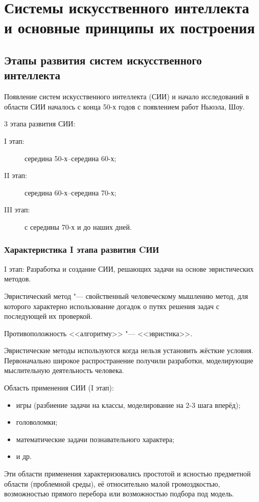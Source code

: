 \chapter{Системы искусственного интеллекта и основные принципы их построения}

\section{Этапы развития систем искусственного интеллекта}
Появление систем искусственного интеллекта (СИИ) и начало исследований
в области СИИ началось с конца 50-х годов с появлением работ Ньюэла,
Шоу.

3 этапа развития СИИ:
\begin{description}
\item[I этап:] середина 50-х--середина 60-х;
\item[II этап:] середина 60-х--середина 70-х;
\item[III этап:] с середины 70-х и до наших дней.
\end{description}

\subsection{Характеристика I этапа развития CИИ}
I этап: Разработка и создание СИИ, решающих задачи на основе
эвристических методов.

Эвристический метод "--- свойственный человеческому мышлению метод, для
которого характерно использование догадок о путях решения задач с
последующей их проверкой.

Противоположность <<алгоритму>> "--- <<эвристика>>.

Эвристические методы используются когда нельзя установить жёсткие
условия. Первоначально широкое распространение получили разработки,
моделирующие мыслительную деятельность человека.

Область применения СИИ (I этап):
\begin{itemize}
\item игры (разбиение задачи на классы, моделирование на 2-3 шага
  вперёд);
\item головоломки;
\item математические задачи познавательного характера;
\item и др.
\end{itemize}

Эти области применения характеризовались простотой и ясностью
предметной области (проблемной среды), её относительно малой
громоздкостью, возможностью прямого перебора или возможностью подбора
под модель.

